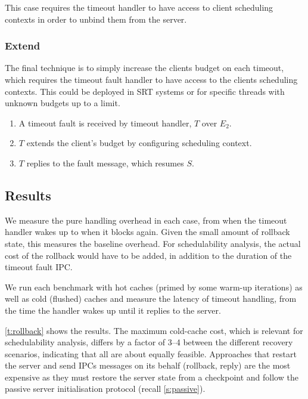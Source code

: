 This case requires the timeout handler to have access to client scheduling contexts in order to
unbind them from the server. 

\subsubsection{Extend}

The final technique is to simply increase the clients budget on each timeout, which requires the
timeout fault handler to have access to the clients scheduling contexts.
This could be deployed in \gls{SRT} systems or for specific threads with unknown budgets up to a limit. 

\begin{enumerate}\label{e:extend}
    \item A timeout fault is received by timeout handler, $T$ over $E_{2}$.
    \item $T$ extends the client's budget by configuring scheduling context.
    \item $T$ replies to the fault message, which resumes $S$.
\end{enumerate}

\subsection{Results}

We measure the pure handling overhead in each case, from when the timeout handler wakes up to when
it blocks again.  Given the small amount of rollback state, this measures the baseline overhead. For
schedulability analysis, the actual cost of the rollback would have to be added, in addition to the
duration of the timeout fault IPC. 
 
We run each benchmark with hot caches (primed by some warm-up
iterations)  as well as cold (flushed) caches and measure the 
latency of timeout handling, from the time the handler wakes up
until it replies to the server.

\autoref{t:rollback} shows the results. The maximum
cold-cache cost, which is relevant for schedulability analysis, differs by a factor of 3--4 between
the different recovery scenarios, indicating that all are about equally feasible.  Approaches that
restart the server and send \glspl{IPC} messages on its behalf (rollback, reply) are the most
expensive as they must restore the server state from a checkpoint and follow the passive server
initialisation protocol (recall \autoref{s:passive}). 


